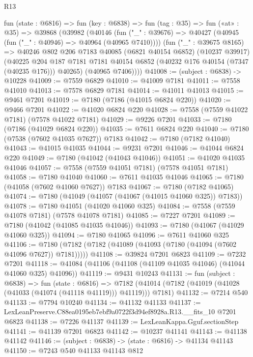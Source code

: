 \begin{lexlean}{R13}
\begin{coremodule}
  fun (state : @6816) =>
  fun (key : @6838) =>
  fun (tag : @35) =>
  fun («at» : @35) =>
  @39868
    (@39982
      (@40146
        (fun ("_" : @39676) => @40427 (@40945 (fun ("_" : @40946) => @40964 (@40965 @7410))))
        (fun ("_" : @39675 @8165) =>
        @40246
          @802
          @206
          @7183
          @40085
          (@6821 @40154 @6852)
          (@10237 @39917)
          (@40225
            @204
            @187
            @7181
            @7181
            @40154
            @6852
            (@40232 @176 @40154 (@7347 (@40235 @176)))
            @40265)
          (@40965 @7406))))
@41008 := (subject : @6838) -> @10228
@41009 := @7559 @6829
@41010 := @41009 @7181
@41011 := @7558 @41010
@41013 := @7578 @6829 @7181
@41014 := @41011 @41013
@41015 := @9461 @7201
@41019 := @7180 (@7186 (@41015 @6824 @220))
@41020 := @9466 @7201
@41022 := @41020 @6824 @220
@41028 := @7558 (@7559 @41022 @7181) (@7578 @41022 @7181)
@41029 := @9226 @7201
@41033 := @7180 (@7186 (@41029 @6824 @220))
@41035 := @7611 @6824 @220
@41040 := @7180 (@7538 (@7602 @41035 @7627)) @7183
@41042 := @7180 (@7182 @41040)
@41043 := @41015 @41035
@41044 := @9231 @7201
@41046 := @41044 @6824 @220
@41049 := @7180 (@41042 (@41043 @41046))
@41051 := @41020 @41035 @41046
@41057 := @7558 (@7559 @41051 @7181) (@7578 @41051 @7181)
@41058 := @7180 @41040
@41060 := @7611 @41035 @41046
@41065 := @7180 (@41058 (@7602 @41060 @7627)) @7183
@41067 := @7180 (@7182 @41065)
@41074 := @7180 (@41049 (@41057 (@41067 (@41015 @41060 @325)) @7183))
@41078 := @7180 @41051 (@41020 @41060 @325)
@41084 := @7558 (@7559 @41078 @7181) (@7578 @41078 @7181)
@41085 := @7227 @7201
@41089 := @7180 (@41042 (@41085 @41035 @41046))
@41093 := @7180 (@41067 (@41029 @41060 @325))
@41094 := @7180 @41065
@41096 := @7611 @41060 @325
@41106 := @7180 (@7182 (@7182 (@41089 (@41093 (@7180 (@41094 (@7602 @41096 @7627)) @7181)))))
@41108 := @39824 @7201 @6823
@41109 := @7232 @7201
@41118 := @41084 (@41106 (@41108 (@41109 @41035 @41046) (@41044 @41060 @325) @41096))
@41119 := @9431 @10243
@41131 := fun (subject : @6838) =>
  fun (state : @6816) =>
  @7182 (@41014 (@7182 (@41019 (@41028 (@41033 (@41074 (@41118 @41119))) @41119))) @7181)
@41132 := @7214 @540
@41133 := @7794 @10240
@41134 := @41132 @41133
@41137 := LexLeanPreserve.C88ea0195eb7ebf9a0722f3d94ef8928a.R13.__fits_10 @7201 @6823
@41138 := @7226 @41137
@41139 := LexLeanKappa.Gguf.sectionStep
@41141 := @41139 @7201 @6823
@41142 := @10237 @41141
@41143 := @41138 @41142
@41146 := (subject : @6838) -> (state : @6816) -> @41134 @41143
@41150 := @7243 @540 @41133 @41143 @812

\end{coremodule}
\end{lexlean}
